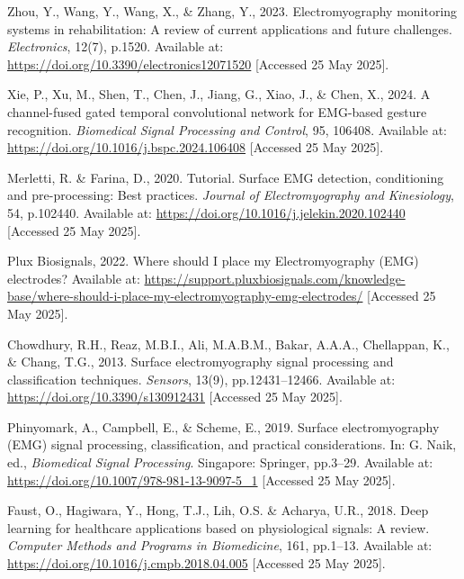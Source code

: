 \begin{multicols}{2}
\renewcommand{\refname}{References}

\begin{thebibliography}{99}\footnotesize 

Zhou, Y., Wang, Y., Wang, X., \& Zhang, Y., 2023. Electromyography monitoring systems in rehabilitation: A review of current applications and future challenges. \textit{Electronics}, 12(7), p.1520. Available at: \url{https://doi.org/10.3390/electronics12071520} [Accessed 25 May 2025].

Xie, P., Xu, M., Shen, T., Chen, J., Jiang, G., Xiao, J., \& Chen, X., 2024. A channel-fused gated temporal convolutional network for EMG-based gesture recognition. \textit{Biomedical Signal Processing and Control}, 95, 106408. Available at: \url{https://doi.org/10.1016/j.bspc.2024.106408} [Accessed 25 May 2025].

Merletti, R. \& Farina, D., 2020. Tutorial. Surface EMG detection, conditioning and pre-processing: Best practices. \textit{Journal of Electromyography and Kinesiology}, 54, p.102440. Available at: \url{https://doi.org/10.1016/j.jelekin.2020.102440} [Accessed 25 May 2025].

Plux Biosignals, 2022. Where should I place my Electromyography (EMG) electrodes? Available at: \url{https://support.pluxbiosignals.com/knowledge-base/where-should-i-place-my-electromyography-emg-electrodes/} [Accessed 25 May 2025].

Chowdhury, R.H., Reaz, M.B.I., Ali, M.A.B.M., Bakar, A.A.A., Chellappan, K., \& Chang, T.G., 2013. Surface electromyography signal processing and classification techniques. \textit{Sensors}, 13(9), pp.12431–12466. Available at: \url{https://doi.org/10.3390/s130912431} [Accessed 25 May 2025].

Phinyomark, A., Campbell, E., \& Scheme, E., 2019. Surface electromyography (EMG) signal processing, classification, and practical considerations. In: G. Naik, ed., \textit{Biomedical Signal Processing}. Singapore: Springer, pp.3–29. Available at: \url{https://doi.org/10.1007/978-981-13-9097-5_1} [Accessed 25 May 2025].

Faust, O., Hagiwara, Y., Hong, T.J., Lih, O.S. \& Acharya, U.R., 2018. Deep learning for healthcare applications based on physiological signals: A review. \textit{Computer Methods and Programs in Biomedicine}, 161, pp.1–13. Available at: \url{https://doi.org/10.1016/j.cmpb.2018.04.005} [Accessed 25 May 2025].


\end{thebibliography}
\end{multicols}
